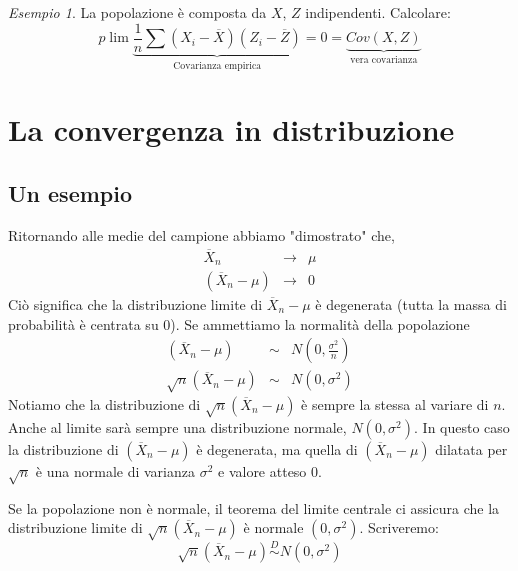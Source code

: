 \documentclass[a4paper]{report}
\newcounter{ese}
\theoremstyle{remark}
\newtheorem{esempio}[ese]{Esempio}
\newcounter{theor}
\begin{document}
\begin{esempio}
La popolazione \`{e} composta da $X$, $Z$ indipendenti. Calcolare: 
\begin{equation*}
p\lim \underset{\text{Covarianza empirica}}{\underbrace{\frac{1}{n}\sum
\left( X_{i}-\overline{X}\right) \left( Z_{i}-\overline{Z}\right) }}=0=%
\underset{\text{vera covarianza}}{\underbrace{Cov\left( X,Z\right) }}
\end{equation*}
\end{esempio}

\section{La convergenza in distribuzione}

\subsection{Un esempio}

Ritornando alle medie del campione abbiamo "dimostrato" che, 
\begin{eqnarray*}
\overline{X}_{n} &\rightarrow &\mu \\
\left( \overline{X}_{n}-\mu \right) &\rightarrow &0
\end{eqnarray*}%
Ci\`{o} significa che la distribuzione limite di $\overline{X}_{n}-\mu $ 
\`{e} degenerata (tutta la massa di probabilit\`{a} \`{e} centrata su 0). Se
ammettiamo la normalit\`{a} della popolazione 
\begin{eqnarray*}
\left( \overline{X}_{n}-\mu \right) &\sim &N(0,\frac{\sigma ^{2}}{n}) \\
\sqrt{n}\left( \overline{X}_{n}-\mu \right) &\sim &N\left( 0,\sigma
^{2}\right)
\end{eqnarray*}%
Notiamo che la distribuzione di $\sqrt{n}\left( \overline{X}_{n}-\mu \right) 
$ \`{e} sempre la stessa al variare di $n$. Anche al limite sar\`{a} sempre
una distribuzione normale, $N\left( 0,\sigma ^{2}\right) $. In questo caso
la distribuzione di $\left( \overline{X}_{n}-\mu \right) $ \`{e} degenerata,
ma quella di $\left( \overline{X}_{n}-\mu \right) $ dilatata per $\sqrt{n}$ 
\`{e} una normale di varianza $\sigma ^{2}$ e valore atteso $0$.

\noindent Se la popolazione non \`{e} normale, il teorema del limite
centrale ci assicura che la distribuzione limite di $\sqrt{n}\left( 
\overline{X}_{n}-\mu \right) $ \`{e} normale $\left( 0,\sigma ^{2}\right) $.
Scriveremo: 
\begin{equation*}
\sqrt{n}\left( \overline{X}_{n}-\mu \right) \overset{D}{\sim }N\left(
0,\sigma ^{2}\right)
\end{equation*}
\end{document}
